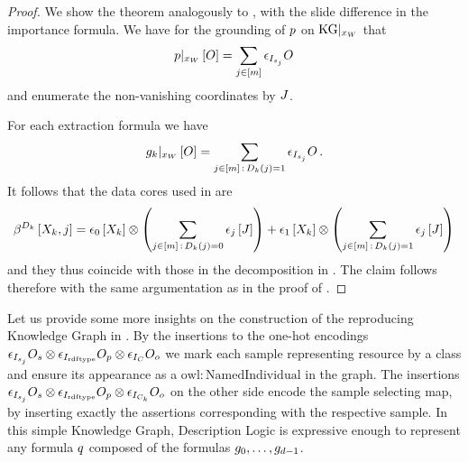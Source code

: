\begin{proof}
    We show the theorem analogously to , with the slide difference in the importance formula.
    We have for the grounding of $p$ on $\mathrm{KG}|_{x_{W}}$ that
    \begin{align*}
        {p}|_{x_{W}}\left[O\right] = \sum_{j\in[m]}  \epsilon_{I_{s_j}}{O}
    \end{align*}
    and enumerate the non-vanishing coordinates by $J$.

    For each extraction formula we have
    \begin{align*}
        {g_{k}}|_{x_{W}}\left[O\right] = \sum_{j\in[m] \,:\, D_{k}(j)=1} \epsilon_{I_{s_j}}{O} \,.
    \end{align*}
    It follows that the data cores used in  are
    \begin{align*}
        \bencodingofat{\datamap_\atomenumerator}{\catvariableof{\atomenumerator},\datindex}
        = \onehotmapofat{0}{\catvariableof{\atomenumerator}} \otimes \left(\sum_{\datindexin \, : \, \datamap_{\atomenumerator}(\datindex)=0} \onehotmapofat{\datindex}{\datvariable}\right)
        +\tbasisat{\catvariableof{\atomenumerator}} \otimes \left(\sum_{\datindexin \, : \, \datamap_{\atomenumerator}(\datindex)=1} \onehotmapofat{\datindex}{\datvariable}\right)
    \end{align*}
    and they thus coincide with those in the decomposition in .
    The claim follows therefore with the same argumentation as in the proof of .
\end{proof}

%
Let us provide some more insights on the construction of the reproducing Knowledge Graph in .
By the insertions to the one-hot encodings $\epsilon_{I_{s_j}}{O_{s}} \otimes \epsilon_{I_{\mathrm{rdf}\mathrm{type}}}{O_{p}} \otimes \epsilon_{I_{C}}{O_{o}}$ we mark each sample representing resource by a class and ensure its appearance as a $\mathrm{owl:NamedIndividual}$ in the graph.
The insertions $\epsilon_{I_{s_j}}{O_{s}}\otimes \epsilon_{I_{\mathrm{rdf}\mathrm{type}}}{O_{p}} \otimes \epsilon_{I_{C_k}}{O_{o}}$ on the other side encode the sample selecting map, by inserting exactly the assertions corresponding with the respective sample.
%
In this simple Knowledge Graph, Description Logic is expressive enough to represent any formula $q$ composed of the formulas $g_{0},\ldots,g_{d-1}$.

